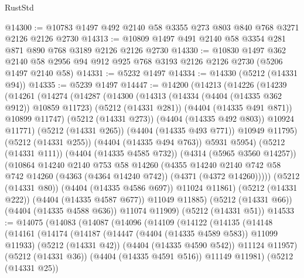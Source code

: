 \begin{lexlean}{RustStd}
\begin{coremodule}
{\begin{coremodule}
{{{{{{{{{{{{{{{{@14300 := @10783 @1497 @492 @2140 @58 @3355 @273 @803 @840 @768 @3271 @2126 @2126 @2730
@14313 := @10809 @1497 @491 @2140 @58 @3354 @281 @871 @890 @768 @3189 @2126 @2126 @2730
@14330 := @10830
    @1497
    @362
    @2140
    @58
    @2956
    @94
    @912
    @925
    @768
    @3193
    @2126
    @2126
    @2730
    (@5206 @1497 @2140 @58)
@14331 := @5232 @1497
@14334 := @14330 (@5212 (@14331 @94))
@14335 := @5239 @1497
@14447 := @14200
    (@14213
      (@14226
        (@14239
          (@14261
            (@14274
              (@14287
                (@14300
                  (@14313
                    (@14334 (@4404 (@14335 @362 @912)) @10859 @11723)
                    (@5212 (@14331 @281))
                    (@4404 (@14335 @491 @871))
                    @10899
                    @11747)
                  (@5212 (@14331 @273))
                  (@4404 (@14335 @492 @803))
                  @10924
                  @11771)
                (@5212 (@14331 @265))
                (@4404 (@14335 @493 @771))
                @10949
                @11795)
              (@5212 (@14331 @255))
              (@4404 (@14335 @494 @763))
              @5931
              @5954)
            (@5212 (@14331 @111))
            (@4404 (@14335 @4585 @732))
            (@4314 (@5965 @3560 @14257))
            (@10864
              @14240
              @2140
              @753
              @58
              @14260
              (@4355
                @14240
                @2140
                @742
                @58
                @742
                @14260
                (@4363 (@4364 @14240 @742))
                (@4371 (@4372 @14260)))))
          (@5212 (@14331 @80))
          (@4404 (@14335 @4586 @697))
          @11024
          @11861)
        (@5212 (@14331 @222))
        (@4404 (@14335 @4587 @677))
        @11049
        @11885)
      (@5212 (@14331 @66))
      (@4404 (@14335 @4588 @636))
      @11074
      @11909)
    (@5212 (@14331 @51))
@14533 := @14075
    (@14083
      (@14087
        (@14096
          (@14109
            (@14122
              (@14135
                (@14148
                  (@14161
                    (@14174
                      (@14187
                        (@14447 (@4404 (@14335 @4589 @583)) @11099 @11933)
                        (@5212 (@14331 @42))
                        (@4404 (@14335 @4590 @542))
                        @11124
                        @11957)
                      (@5212 (@14331 @36))
                      (@4404 (@14335 @4591 @516))
                      @11149
                      @11981)
                    (@5212 (@14331 @25))
}}}}}}}}}}}}}}}}
\end{coremodule}}
\end{coremodule}
\end{lexlean}
